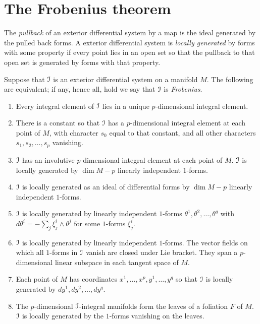 \section{The Frobenius theorem}
The \emph{pullback} of an exterior differential system by a map is the ideal generated by the pulled back forms.
A exterior differential system is \emph{locally generated} by forms with some property if every point lies in an open set so that the pullback to that open set is generated by forms with that property.
\begin{theorem}[Frobenius]
Suppose that \(\mathcal{I}\) is an exterior differential system on a manifold \(M\).
The following are equivalent; if any, hence all, hold we say that \(\mathcal{I}\) is \emph{Frobenius}.
\begin{enumerate}
\item 
Every integral element of \(\mathcal{I}\) lies in a unique \(p\)-dimensional integral element.
\item
There is a constant so that \(\mathcal{I}\) has a \(p\)-dimensional integral element at each point of \(M\), with character \(s_0\) equal to that constant, and all other characters \(s_1,s_2,\dots,s_p\) vanishing.
\item
\(\mathcal{I}\) has an involutive \(p\)-dimensional integral element at each point of \(M\).
\(\mathcal{I}\) is locally generated by \(\dim M - p\) linearly independent \(1\)-forms.
\item
\(\mathcal{I}\) is locally generated as an ideal of differential forms by \(\dim M - p\) linearly independent \(1\)-forms.
\item
\(\mathcal{I}\) is locally generated by linearly independent \(1\)-forms \(\theta^1,\theta^2,\dots,\theta^q\) with \(d\theta^i=-\sum_j \xi^i_j \wedge \theta^j\) for some \(1\)-forms \(\xi^i_j\).
\item 
\(\mathcal{I}\) is locally generated by linearly independent \(1\)-forms.
The vector fields on which all \(1\)-forms in \(\mathcal{I}\) vanish are closed under Lie bracket.
They span a \(p\)-dimensional linear subspace in each tangent space of \(M\). 
\item
Each point of \(M\) has coordinates \(x^1,\dots,x^p,y^1,\dots,y^q\) so that \(\mathcal{I}\) is locally generated by \(dy^1,dy^2,\dots,dy^q\).
\item
The \(p\)-dimensional \(\mathcal{I}\)-integral manifolds form the leaves of a foliation \(F\) of \(M\). \(\mathcal{I}\) is locally generated by the \(1\)-forms vanishing on the leaves.
\end{enumerate}
\end{theorem}
